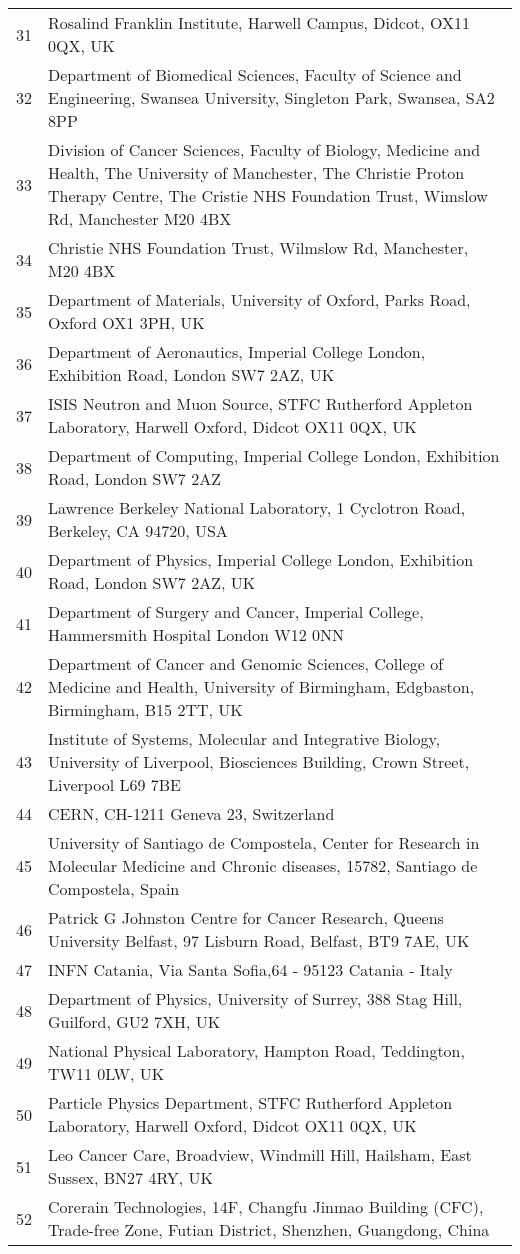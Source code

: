 {\begin{tabular}{ c p{15cm} }
     31 & Rosalind Franklin Institute, Harwell Campus, Didcot, OX11 0QX, UK\\
     32 & Department of Biomedical Sciences, Faculty of Science and Engineering, Swansea University, Singleton Park, Swansea, SA2 8PP\\
     33 & Division of Cancer Sciences, Faculty of Biology, Medicine and Health, The University of Manchester, The Christie Proton Therapy Centre, The Cristie NHS Foundation Trust, Wimslow Rd, Manchester M20 4BX\\
     34 & Christie NHS Foundation Trust, Wilmslow Rd, Manchester, M20 4BX\\
     35 & Department of Materials, University of Oxford, Parks Road, Oxford OX1 3PH, UK\\
     36 & Department of Aeronautics, Imperial College London, Exhibition Road, London SW7 2AZ, UK\\
     37 & ISIS Neutron and Muon Source, STFC Rutherford Appleton Laboratory, Harwell Oxford, Didcot OX11 0QX, UK\\
     38 & Department of Computing, Imperial College London, Exhibition Road, London SW7 2AZ\\
     39 & Lawrence Berkeley National Laboratory, 1 Cyclotron Road, Berkeley, CA 94720, USA\\
     40 & Department of Physics, Imperial College London, Exhibition Road, London SW7 2AZ, UK\\
     41 & Department of Surgery and Cancer, Imperial College, Hammersmith Hospital London W12 0NN\\
     42 & Department of Cancer and Genomic Sciences, College of Medicine and Health, University of Birmingham, Edgbaston, Birmingham, B15 2TT, UK\\
     43 & Institute of Systems, Molecular and Integrative Biology, University of Liverpool, Biosciences Building, Crown Street, Liverpool L69 7BE\\
     44 & CERN, CH-1211 Geneva 23, Switzerland\\
     45 & University of Santiago de Compostela, Center for Research in Molecular Medicine and Chronic diseases, 15782, Santiago de Compostela, Spain\\
     46 & Patrick G Johnston Centre for Cancer Research, Queens University Belfast, 97 Lisburn Road, Belfast, BT9 7AE, UK\\
     47 & INFN Catania, Via Santa Sofia,64 - 95123 Catania - Italy\\
     48 & Department of Physics, University of Surrey, 388 Stag Hill, Guilford, GU2 7XH, UK\\
     49 & National Physical Laboratory, Hampton Road, Teddington, TW11 0LW, UK\\
     50 & Particle Physics Department, STFC Rutherford Appleton Laboratory, Harwell Oxford, Didcot OX11 0QX, UK\\
     51 & Leo Cancer Care, Broadview, Windmill Hill, Hailsham, East Sussex, BN27 4RY, UK\\
     52 & Corerain Technologies, 14F, Changfu Jinmao Building (CFC), Trade-free Zone, Futian District, Shenzhen, Guangdong, China\\
  \end{tabular}
}
